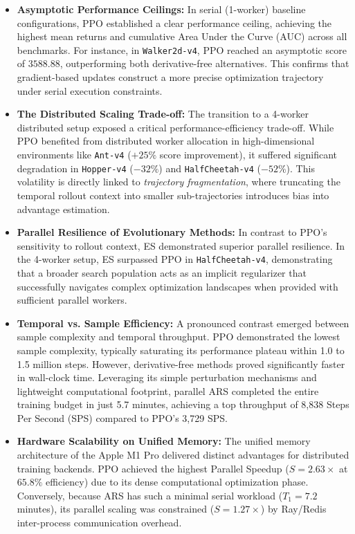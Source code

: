 \begin{itemize}
    \item \textbf{Asymptotic Performance Ceilings:} In serial (1-worker) baseline configurations, PPO established a clear performance ceiling, achieving the highest mean returns and cumulative Area Under the Curve (AUC) across all benchmarks. For instance, in \texttt{Walker2d-v4}, PPO reached an asymptotic score of $3588.88$, outperforming both derivative-free alternatives. This confirms that gradient-based updates construct a more precise optimization trajectory under serial execution constraints.
    
    \item \textbf{The Distributed Scaling Trade-off:} The transition to a 4-worker distributed setup exposed a critical performance-efficiency trade-off. While PPO benefited from distributed worker allocation in high-dimensional environments like \texttt{Ant-v4} ($+25\%$ score improvement), it suffered significant degradation in \texttt{Hopper-v4} ($-32\%$) and \texttt{HalfCheetah-v4} ($-52\%$). This volatility is directly linked to \textit{trajectory fragmentation}, where truncating the temporal rollout context into smaller sub-trajectories introduces bias into advantage estimation. 
    
    \item \textbf{Parallel Resilience of Evolutionary Methods:} In contrast to PPO's sensitivity to rollout context, ES demonstrated superior parallel resilience. In the 4-worker setup, ES surpassed PPO in \texttt{HalfCheetah-v4}, demonstrating that a broader search population acts as an implicit regularizer that successfully navigates complex optimization landscapes when provided with sufficient parallel workers.

    \item \textbf{Temporal vs. Sample Efficiency:} A pronounced contrast emerged between sample complexity and temporal throughput. PPO demonstrated the lowest sample complexity, typically saturating its performance plateau within 1.0 to 1.5 million steps. However, derivative-free methods proved significantly faster in wall-clock time. Leveraging its simple perturbation mechanisms and lightweight computational footprint, parallel ARS completed the entire training budget in just 5.7 minutes, achieving a top throughput of 8,838 Steps Per Second (SPS) compared to PPO's 3,729 SPS.

    \item \textbf{Hardware Scalability on Unified Memory:} The unified memory architecture of the Apple M1 Pro delivered distinct advantages for distributed training backends. PPO achieved the highest Parallel Speedup ($S = 2.63\times$ at $65.8\%$ efficiency) due to its dense computational optimization phase. Conversely, because ARS has such a minimal serial workload ($T_1 = 7.2$ minutes), its parallel scaling was constrained ($S = 1.27\times$) by Ray/Redis inter-process communication overhead.


\end{itemize}
